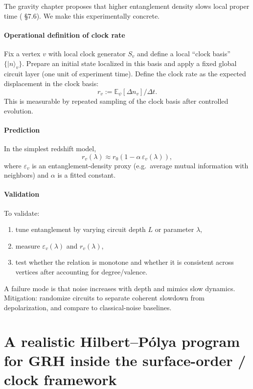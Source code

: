 \documentclass[11pt,oneside]{amsbook}
\numberwithin{equation}{section}
\theoremstyle{plain}
\theoremstyle{definition}
\theoremstyle{remark}
\begin{document}
The  gravity chapter proposes that higher entanglement density slows local proper time ( \S7.6).
We make this experimentally concrete.

\subsubsection{Operational definition of clock rate}
Fix a vertex $v$ with local clock generator $S_v$ and define a local ``clock basis'' $\{|n\rangle_v\}$.
Prepare an initial state localized in this basis and apply a fixed global circuit layer (one unit of experiment time).
Define the clock rate as the expected displacement in the clock basis:
\[
r_v := \mathbb{E}_\psi[\Delta n_v]/\Delta t.
\]
This is measurable by repeated sampling of the clock basis after controlled evolution.

\subsubsection{Prediction}
In the simplest redshift model,
\[
r_v(\lambda) \approx r_0\left(1 - \alpha \,\varepsilon_v(\lambda)\right),
\]
where $\varepsilon_v$ is an entanglement-density proxy (e.g.\ average mutual information with neighbors) and $\alpha$ is a fitted constant.

\subsubsection{Validation}
To validate:
\begin{enumerate}
\item tune entanglement by varying circuit depth $L$ or parameter $\lambda$,
\item measure $\varepsilon_v(\lambda)$ and $r_v(\lambda)$,
\item test whether the relation is monotone and whether it is consistent across vertices after accounting for degree/valence.
\end{enumerate}

A failure mode is that noise increases with depth and mimics slow dynamics.
Mitigation: randomize circuits to separate coherent slowdown from depolarization, and compare to classical-noise baselines.


\chapter{A realistic Hilbert--Pólya program for GRH inside the surface-order / clock framework}
\label{ch:hilbertpolya}
\end{document}
